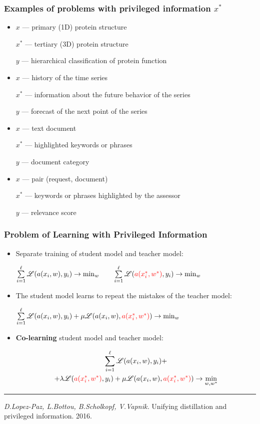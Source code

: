 \documentclass[fullscreen=true, bookmarks=true, hyperref={pdfencoding=unicode}]{beamer}
\begin{document}
\begin{frame}
\frametitle{Examples of problems with privileged information $x^*$}
  \begin{itemize}
    \item $x$ — primary (1D) protein structure

          $x^*$ — tertiary (3D) protein structure

          $y$ — hierarchical classification of protein function
    \item $x$ — history of the time series

          $x^*$ — information about the future behavior of the series

          $y$ — forecast of the next point of the series
    \item $x$ — text document

          $x^*$ — highlighted keywords or phrases

          $y$ — document category
    \item $x$ — pair (request, document)

          $x^*$ — keywords or phrases highlighted by the assessor

          $y$ — relevance score
  \end{itemize}
\end{frame}


\begin{frame}
  \frametitle{Problem of Learning with Privileged Information}

  \begin{itemize}
    \item Separate training of student model and {\color{red} teacher model}:

    $\sum\limits_{i=1}^\ell \mathscr{L}(a(x_i, w), y_i) \to \min_{w} \quad\quad
    \sum\limits_{i=1}^\ell \mathscr{L}({\color{red}a(x_i^*, w^*)}, y_i) \to \min_{w} $

    \item The student model learns to repeat the mistakes of the {\color{red} teacher model}:

    $\sum\limits_{i=1}^\ell \mathscr{L}(a(x_i, w), y_i) + \mu
     \mathscr{L}(a(x_i, w), {\color{red}a(x_i^*, w^*)}) \to \min_{w} $

    \item {\bf Co-learning} student model and {\color{red} teacher model}:

    \begin{multline*}
    \sum\limits_{i=1}^\ell \mathscr{L}(a(x_i, w), y_i) + \\
    + \lambda \mathscr{L}({\color{red}a(x_i^*, w ^*)}, y_i) 
    + \mu \mathscr{L}(a(x_i, w), {\color{red}a(x_i^*, w^*)}) \to \min_{w, w^*}
    \end{multline*}
  \end{itemize}

  \vspace{0.5cm}
  \noindent\rule{8cm}{0.4pt}

  {\footnotesize
  {\it D.Lopez-Paz, L.Bottou, B.Scholkopf, V.Vapnik.} Unifying distillation and privileged information. 2016.}
\end{frame}
\end{document}
